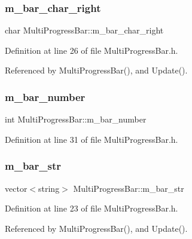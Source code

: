 \subsubsection{m\+\_\+bar\+\_\+char\+\_\+right}
{\footnotesize\ttfamily char Multi\+Progress\+Bar\+::m\+\_\+bar\+\_\+char\+\_\+right\hspace{0.3cm}{\ttfamily [protected]}}



Definition at line 26 of file Multi\+Progress\+Bar.\+h.



Referenced by Multi\+Progress\+Bar(), and Update().

\mbox{\label{classMultiProgressBar_a1a3803e31fc7bc086854ab6f1c6e7667_a1a3803e31fc7bc086854ab6f1c6e7667}} 
\subsubsection{m\+\_\+bar\+\_\+number}
{\footnotesize\ttfamily int Multi\+Progress\+Bar\+::m\+\_\+bar\+\_\+number\hspace{0.3cm}{\ttfamily [protected]}}



Definition at line 31 of file Multi\+Progress\+Bar.\+h.

\mbox{\label{classMultiProgressBar_af35a7ef9e9f8f6078cd053d4c1c57c13_af35a7ef9e9f8f6078cd053d4c1c57c13}} 
\subsubsection{m\+\_\+bar\+\_\+str}
{\footnotesize\ttfamily vector$<$string$>$ Multi\+Progress\+Bar\+::m\+\_\+bar\+\_\+str\hspace{0.3cm}{\ttfamily [protected]}}



Definition at line 23 of file Multi\+Progress\+Bar.\+h.



Referenced by Multi\+Progress\+Bar(), and Update().

\mbox{\label{classMultiProgressBar_a4a81485c32d529951d4f7ad2962fe990_a4a81485c32d529951d4f7ad2962fe990}} 
